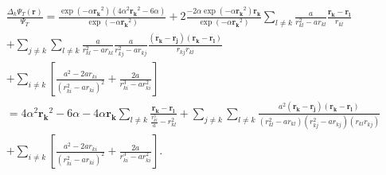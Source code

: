 \begin{gather*}
	\frac{\Delta _k \Psi_T(\boldsymbol{r})}{\Psi _T}= \frac{\exp(-\alpha
		\boldsymbol{r_k}^2)(4\alpha ^2 \boldsymbol{r_k}^2-6\alpha )}{\exp(-\alpha
		\boldsymbol{r_k}^2)}
	+2 \frac{-2\alpha \exp(-\alpha\boldsymbol{r_k}^2)\boldsymbol{r_k}}{\exp(-\alpha \boldsymbol{r_k}^2)}
	\sum_{l \neq k}^{}\frac{a}{r _{kl}^2-ar _{kl}}\frac{\boldsymbol{r_k}-\boldsymbol{r_l}}{r_{kl}}\\
	+\sum_{j \neq k}^{}\sum_{l \neq k}^{}\frac{a}{r _{kl}^2-ar_{kl}}
	\frac{a}{r _{kj}^2-ar_{kj}}\frac{(\boldsymbol{r_k}-\boldsymbol{r_j})
	(\boldsymbol{r_k}-\boldsymbol{r_l})}{r_{kj}r _{kl}}\\
	+ \sum_{i \neq k}^{} \left[\frac{a^2-2ar _{ki}}{(r _{ki}^2-ar _{ki})^2}+\frac{2a}{r _{ki}^3-ar _{ki}^2}\right]\\
	= 4\alpha ^2 \boldsymbol{r_k}^2-6\alpha -4\alpha \boldsymbol{r_k} \sum_{l \neq k}^{}\frac{\boldsymbol{r_k}-\boldsymbol{r_l}}{\frac{r_{kl}^3}{a}-r _{kl}^2}
	+\sum_{j \neq k}^{}\sum_{l \neq k}^{}\frac{a^2(\boldsymbol{r_k}-\boldsymbol{r_j})(\boldsymbol{r_k}-\boldsymbol{r_l})}{(r _{kl}^2-ar _{kl})(r _{kj}^2-ar _{kj})(r _{kl}r _{kj})}\\
	+ \sum_{i \neq k}^{} \left[\frac{a^2-2ar _{ki}}{(r _{ki}^2-ar _{ki})^2}+\frac{2a}{r _{ki}^3-ar _{ki}^2}\right].
\end{gather*}
